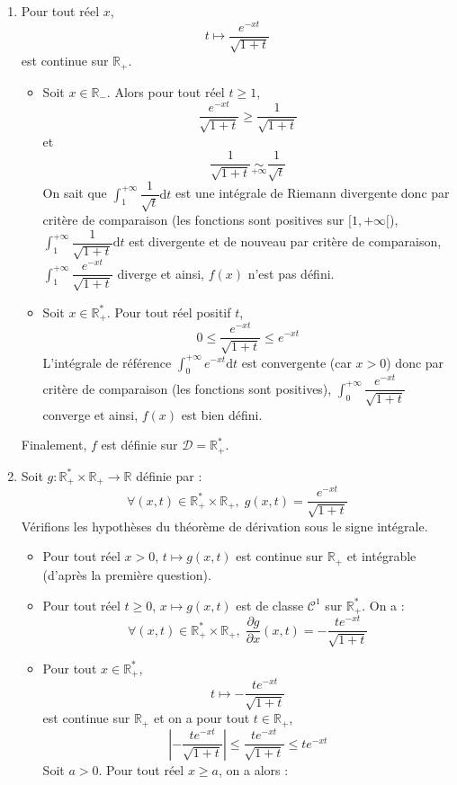 \documentclass[a4paper,twoside,french,11pt]{VcCours}
\newcommand{\dt}{\text{d}t}
\begin{document}
\begin{enumerate}
\item Pour tout réel $x$,
$$ t \mapsto \dfrac{e^{-xt}}{\sqrt{1+t}}$$
est continue sur $\mathbb{R}_+$.

\begin{itemize}
\item Soit $x \in \mathbb{R}_{-}$. Alors pour tout réel $t \geq 1$,
$$ \dfrac{e^{-xt}}{\sqrt{1+t}} \geq \dfrac{1}{\sqrt{1+t}}$$
et 
$$ \dfrac{1}{\sqrt{1+t}} \underset{+ \infty}{\sim} \dfrac{1}{\sqrt{t}}$$
On sait que $\int_1^{+ \infty} \dfrac{1}{\sqrt{t}} \dt$ est une intégrale de Riemann divergente donc par critère de comparaison (les fonctions sont positives sur $[1, + \infty[$), $\int_1^{+ \infty}  \dfrac{1}{\sqrt{1+t}}  \dt$ est divergente et de nouveau par critère de comparaison, $\int_1^{+ \infty} \dfrac{e^{-xt}}{\sqrt{1+t}}$ diverge et ainsi, $f(x)$ n'est pas défini.
\item Soit $x \in \mathbb{R}_+^*$. Pour tout réel positif $t$,
$$ 0 \leq  \dfrac{e^{-xt}}{\sqrt{1+t}} \leq e^{-xt}$$
L'intégrale de référence $\int_0^{+ \infty} e^{-xt} \dt$ est convergente (car $x>0$) donc par critère de comparaison (les fonctions sont positives), $ \int_0^{+ \infty} \dfrac{e^{-xt}}{\sqrt{1+t}}$ converge et ainsi, $f(x)$ est bien défini.
\end{itemize}
Finalement, $f$ est définie sur $\mathcal{D}= \mathbb{R}_+^*$.
\item Soit $g : \mathbb{R}_+^* \times \mathbb{R}_+ \rightarrow \mathbb{R}$ définie par :
$$ \forall (x,t) \in \mathbb{R}_+^* \times \mathbb{R}_+, \; g(x,t) = \dfrac{e^{-xt}}{\sqrt{1+t}} $$
Vérifions les hypothèses du théorème de dérivation sous le signe intégrale.
\begin{itemize}
\item Pour tout réel $x>0$, $t \mapsto g(x,t)$ est continue sur $\mathbb{R}_+$ et intégrable (d'après la première question).
\item Pour tout réel $t \geq 0$, $x \mapsto g(x,t)$ est de classe $\mathcal{C}^1$ sur $\mathbb{R}_+^*$. On a :
$$ \forall (x,t) \in \mathbb{R}_+^* \times \mathbb{R}_+, \; \dfrac{\partial g}{\partial x}(x,t) =  -  \dfrac{te^{-xt}}{\sqrt{1+t}}$$
\item Pour tout $x \in \mathbb{R}_+^*$,
$$ t \mapsto   -  \dfrac{te^{-xt}}{\sqrt{1+t}}$$
est continue sur $\mathbb{R}_+$ et on a pour tout $t \in \mathbb{R}_+$,
$$ \left\vert  -  \dfrac{te^{-xt}}{\sqrt{1+t}} \right\vert \leq  \dfrac{te^{-xt}}{\sqrt{1+t}} \leq t e^{-xt}$$
Soit $a>0$. Pour tout réel $x \geq a$, on a alors :

\end{itemize}
\end{enumerate}
\end{document}
